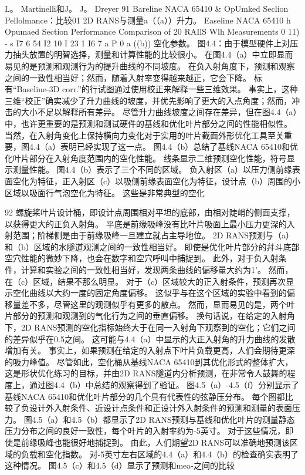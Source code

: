 \documentclass[UTF8,11pt,a4paper,openany,fontset=fandol]{ctexbook}
\begin{document}
L。 Martinelli和J。 J。 Dreyer 91 Bareline NACA 65410 \& OpUmked Seclion Pellolmance：比较01 2D RANS与测量a（（a））升力。 Easeline NACA 65410 h Opumaed Section Performance Comparison of 20 RAIlS Wlh Measurements 0 11) - s I7 6 54 I2 10 I 23 1 I6 7 a P 0 a ((b)) 空化参数。 图4.4：由于模型硬件上对压力抽头放置的明智选择，测量和计算性能的比较很小。 在图4.4（a）中立即显而易见的是预测和观测行为的提升曲线的不同坡度。 在负入射角度下，预测和观察之间的一致性相当好；然而，随着入射率变得越来越正，它会下降。 标有“Baseline-3D corr.”的行试图通过使用校正来解释一些三维效果。 事实上，这种三维“校正”确实减少了升力曲线的坡度，并优先影响了更大的入点角度；然而，冲击的大小不足以解释所有差异。 尽管升力曲线坡度之间存在差异，但在图4.4（a）中，也许更重要的是预测和测试硬件的基线和优化叶片部分之间的性能相似性。 当然，在入射角变化上保持横向力变化对于实用的叶片截面外形优化工具至关重要，图4.4（a）表明已经实现了这一点。 图4.4（b）总结了基线NACA 65410和优化叶片部分在入射角度范围内的空化性能。 线条显示二维预测空化性能，符号显示测量性能。 图4.4（b）表示了三个不同的区域。 负入射区（a）以压力侧前缘表面空化为特征，正入射区（c）以吸侧前缘表面空化为特征，设计点（b）周围的小区域以吸面行气泡空化为特征。 这些是非常典型的空化

92 螺旋桨叶片设计桶，即设计点周围相对平坦的底部，由相对陡峭的侧面支撑，以获得更大的正负入射角。 平底是前缘吸峰没有比叶片吸面上最小压力更深的入射范围；阶梯侧是由于前缘吸峰一旦建立就占主导地位。 2D RANS预测与（a）和（b）区域的水隧道观测之间的一致性相当好。 即使是优化叶片部分的幷斗底部空穴性能的微妙下降，也会在数字和空穴呼叫中捕捉到。 此外，对于负入射条件，计算和实验之间的一致性相当好，发现两条曲线的偏移量大约为1'。 然而，在（c）区域，结果不那么明显。 对于（c）区域较大的正入射条件，预测再次显示空化曲线以大约一度的固定角度偏移。 这似乎与在这个区域的实验中看到的偏移量差不多，尽管这里的观测似乎有更多的散点。 然而，显而易见的是，两个叶片部分的预测和观测到的气化行为之间的垂直偏移。 换句话说，在给定的入射角下，2D RANS预测的空化指标始终大于在同一入射角下观察到的空化；它们之间的差异似乎在0.5之间。 这可能与4.4（a）中显示的大正入射角的升力曲线的发散增加有关。 事实上，如果预测在给定的入射点下叶片负载更高，人们会期待更深的吸力峰值。 尽管如此，空化桶从基线NACA 65410到其优化形式的整体扩大，这是形状优化练习的目标，并由2D RANS隧道内分析预测，在非常令人鼓舞的程度上，通过图4.4（b）中总结的观察得到了验证。 图4.5（a）-4.5（f）分别显示了基线NACA 65410和优化叶片部分的几个具有代表性的弦静压分布。 每个图都比较了负设计外入射条件、近设计点条件和正设计外入射条件的预测和测量的表面压力。 图4.5（a）和4.5（b）都显示了2D RANS预测与基线和优化叶片的测量静态压力分布之间的良好一致性，每个叶片的入射率约为-5英寸。 对于这些情况，即使是前缘吸峰也能很好地捕捉到。 由此，人们期望2D RANS可以准确地预测该区域的负载和空化指数。 对-5英寸左右区域的4.4（a）和4.4（b）的检查确实表明了这种情况。 图4.5（c）和4.5（d）显示了预测和mea-之间的比较
\end{document}

